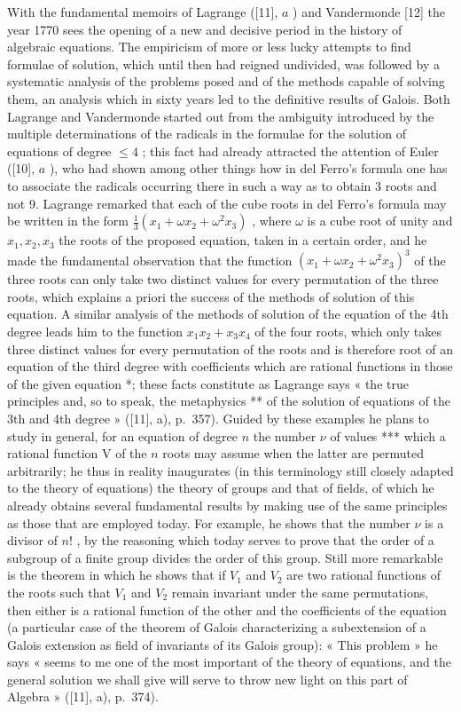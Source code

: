 With the fundamental memoirs of Lagrange ({[}11{]}, \(a\) ) and Vandermonde {[}12{]} the year 1770 sees the opening of a new and decisive period in the history of algebraic equations. The empiricism of more or less lucky attempts to find formulae of solution, which until then had reigned undivided, was followed by a systematic analysis of the problems posed and of the methods capable of solving them, an analysis which in sixty years led to the definitive results of Galois. Both Lagrange and Vandermonde started out from the ambiguity introduced by the multiple determinations of the radicals in the formulae for the solution of equations of degree \(\leqslant 4\) ; this fact had already attracted the attention of Euler ({[}10{]}, \(a\) ), who had shown among other things how in del Ferro's formula one has to associate the radicals occurring there in such a way as to obtain 3 roots and not 9. Lagrange remarked that each of the cube roots in del Ferro's formula may be written in the form \(\frac{1}{3} (x_1 + \omega x_2 + \omega^2 x_3)\) , where \(\omega\) is a cube root of unity and \(x_1, x_2, x_3\) the roots of the proposed equation, taken in a certain order, and he made the fundamental observation that the function \((x_1 + \omega x_2 + \omega^2 x_3)^3\) of the three roots can only take two distinct values for every permutation of the three roots, which explains a priori the success of the methods of solution of this equation. A similar analysis of the methods of solution of the equation of the 4th degree leads him to the function \(x_1 x_2 + x_3 x_4\) of the four roots, which only takes three distinct values for every permutation of the roots and is therefore root of an equation of the third degree with coefficients which are rational functions in those of the given equation *; these facts constitute as Lagrange says « the true principles and, so to speak, the metaphysics ** of the solution of equations of the 3th and 4th degree » ({[}11{]}, a), p.~357). Guided by these examples he plans to study in general, for an equation of degree \(n\) the number \(\nu\) of values *** which a rational function V of the \(n\) roots may assume when the latter are permuted arbitrarily; he thus in reality inaugurates (in this terminology still closely adapted to the theory of equations) the theory of groups and that of fields, of which he already obtains several fundamental results by making use of the same principles as those that are employed today. For example, he shows that the number \(\nu\) is a divisor of \(n!\) , by the reasoning which today serves to prove that the order of a subgroup of a finite group divides the order of this group. Still more remarkable is the theorem in which he shows that if \(V_1\) and \(V_2\) are two rational functions of the roots such that \(V_1\) and \(V_2\) remain invariant under the same permutations, then either is a rational function of the other and the coefficients of the equation (a particular case of the theorem of Galois characterizing a subextension of a Galois extension as field of invariants of its Galois group): « This problem » he says « seems to me one of the most important of the theory of equations, and the general solution we shall give will serve to throw new light on this part of Algebra » ({[}11{]}, a), p.~374).

